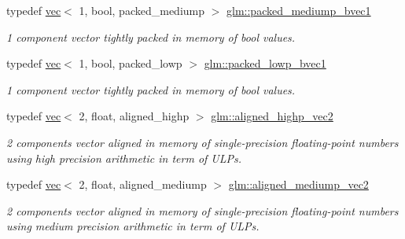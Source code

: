 \begin{DoxyCompactItemize}
\mbox{\label{group__gtc__type__aligned_ga1dd6d3757af9269de00ba70b0f65a648}} 
typedef \hyperlink{structglm_1_1vec}{vec}$<$ 1, bool, packed\+\_\+mediump $>$ \hyperlink{group__gtc__type__aligned_ga1dd6d3757af9269de00ba70b0f65a648}{glm\+::packed\+\_\+mediump\+\_\+bvec1}
\begin{DoxyCompactList}\small\item\em 1 component vector tightly packed in memory of bool values. \end{DoxyCompactList}\item 
\mbox{\label{group__gtc__type__aligned_gab43c5df4bb326006091ee3489bc1c367}} 
typedef \hyperlink{structglm_1_1vec}{vec}$<$ 1, bool, packed\+\_\+lowp $>$ \hyperlink{group__gtc__type__aligned_gab43c5df4bb326006091ee3489bc1c367}{glm\+::packed\+\_\+lowp\+\_\+bvec1}
\begin{DoxyCompactList}\small\item\em 1 component vector tightly packed in memory of bool values. \end{DoxyCompactList}\item 
\mbox{\label{group__gtc__type__aligned_ga7467c1a16f31911de3b927338434af6d}} 
typedef \hyperlink{structglm_1_1vec}{vec}$<$ 2, float, aligned\+\_\+highp $>$ \hyperlink{group__gtc__type__aligned_ga7467c1a16f31911de3b927338434af6d}{glm\+::aligned\+\_\+highp\+\_\+vec2}
\begin{DoxyCompactList}\small\item\em 2 components vector aligned in memory of single-\/precision floating-\/point numbers using high precision arithmetic in term of U\+L\+Ps. \end{DoxyCompactList}\item 
\mbox{\label{group__gtc__type__aligned_ga96e85f0817c2c6734af6c981ce2b3940}} 
typedef \hyperlink{structglm_1_1vec}{vec}$<$ 2, float, aligned\+\_\+mediump $>$ \hyperlink{group__gtc__type__aligned_ga96e85f0817c2c6734af6c981ce2b3940}{glm\+::aligned\+\_\+mediump\+\_\+vec2}
\begin{DoxyCompactList}\small\item\em 2 components vector aligned in memory of single-\/precision floating-\/point numbers using medium precision arithmetic in term of U\+L\+Ps. \end{DoxyCompactList}\item 

\end{DoxyCompactItemize}
